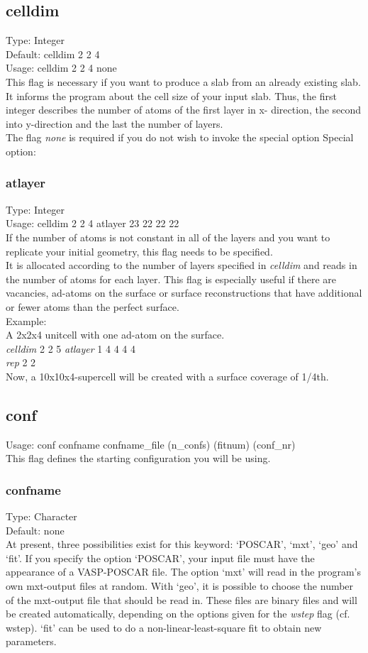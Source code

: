 \documentclass[twoside, 11pt, titlepage, captions=nooneline, a4paper, headsepline]{scrbook}%
\begin{document}
\subsection*{celldim}
Type: Integer\\
Default: celldim 2 2 4 \\
Usage: celldim 2 2 4 none \\
This flag is necessary if you want to produce a slab from an already existing slab. It informs the program about the cell size of your input slab. Thus, the first integer describes the number of atoms of the first layer in x- direction, the second into y-direction and the last the number of layers.\\
The flag \emph{none} is required if you do not wish to invoke the special option
Special option:\\
\subsubsection*{atlayer}
Type: Integer\\
Usage: celldim 2 2 4 atlayer 23 22 22 22\\
If the number of atoms is not constant in all of the layers and you want to replicate your initial geometry, this flag needs to be specified. \\
It is allocated according to the number of layers specified in \emph{celldim} and reads in the number of atoms for each layer. This flag is especially useful if there are vacancies, ad-atoms on the surface or surface reconstructions that have additional or fewer atoms than the perfect surface.\\
Example:\\
A 2x2x4 unitcell with one ad-atom on the surface.\\
\emph{celldim} 2 2 5 \emph{atlayer} 1 4 4 4 4\\
\emph{rep} 2 2\\
Now, a 10x10x4-supercell will be created with a surface coverage of 1/4th.


\subsection*{conf}
\label{inputfiles1}
Usage: conf confname confname\_file (n\_confs) (fitnum) (conf\_nr)\\
This flag defines the starting configuration you will be using.
\subsubsection*{confname}
Type: Character\\
Default: none\\
At present, three possibilities exist for this keyword: `POSCAR', `mxt', `geo' and `fit'. If you specify the option `POSCAR', your input file must have the appearance of a VASP-POSCAR file. The option `mxt' will read in the program's own mxt-output files at random. With `geo', it is possible to choose the number of the mxt-output file that should be read in. These files are binary files and will be created automatically, depending on the options given for the \emph{wstep} flag (cf. wstep). `fit' can be used to do a non-linear-least-square fit to obtain new parameters.
\end{document}
